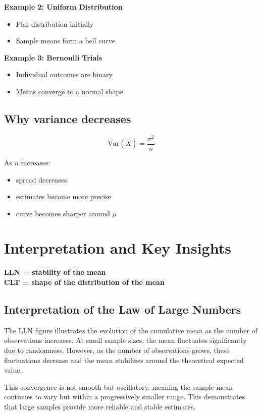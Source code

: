 \documentclass[a4paper,12pt]{article}
\begin{document}
\textbf{Example 2: Uniform Distribution}
\begin{itemize}
\item Flat distribution initially
\item Sample means form a bell curve
\end{itemize}

\textbf{Example 3: Bernoulli Trials}
\begin{itemize}
\item Individual outcomes are binary
\item Means converge to a normal shape
\end{itemize}

\subsection{Why variance decreases}

\[
\text{Var}(\bar{X}) = \frac{\sigma^2}{n}
\]

As $n$ increases:
\begin{itemize}
\item spread decreases
\item estimates become more precise
\item curve becomes sharper around $\mu$
\end{itemize}

\section{Interpretation and Key Insights}

\begin{tcolorbox}
\textbf{LLN = stability of the mean} \\
\textbf{CLT = shape of the distribution of the mean}
\end{tcolorbox}

\subsection{Interpretation of the Law of Large Numbers}

The LLN figure illustrates the evolution of the cumulative mean as the number of observations increases. At small sample sizes, the mean fluctuates significantly due to randomness. However, as the number of observations grows, these fluctuations decrease and the mean stabilizes around the theoretical expected value.

This convergence is not smooth but oscillatory, meaning the sample mean continues to vary but within a progressively smaller range. This demonstrates that large samples provide more reliable and stable estimates.
\end{document}
